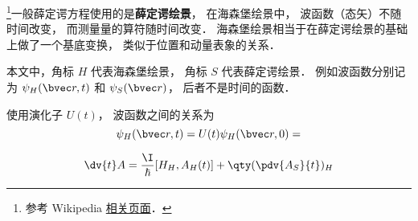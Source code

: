 
\begin{issues}
\issueDraft
\end{issues}

\footnote{参考 Wikipedia \href{https://en.wikipedia.org/wiki/Heisenberg_picture}{相关页面}．}一般薛定谔方程使用的是\textbf{薛定谔绘景}， 在海森堡绘景中， 波函数（态矢）不随时间改变， 而测量量的算符随时间改变． 海森堡绘景相当于在薛定谔绘景的基础上做了一个基底变换， 类似于位置和动量表象的关系．

本文中，角标 $H$ 代表海森堡绘景， 角标 $S$ 代表薛定谔绘景． 例如波函数分别记为 $\psi_H(\bvec r, t)$ 和 $\psi_S(\bvec r)$， 后者不是时间的函数．

使用演化子 $U(t)$， 波函数之间的关系为
\begin{equation}
\psi_H(\bvec r, t) = U(t) \psi_H(\bvec r, 0) = 
\end{equation}


\begin{equation}
\dv{t}A = \frac{\I}{\hbar} [H_H, A_H(t)] + \qty(\pdv{A_S}{t})_H
\end{equation}




